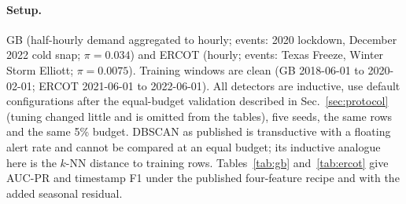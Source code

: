\documentclass[10pt,twocolumn]{article}
\begin{document}
\paragraph{Setup.} GB (half-hourly demand aggregated to hourly; events: 2020 lockdown, December 2022 cold snap; $\pi=0.034$) and ERCOT (hourly; events: Texas Freeze, Winter Storm Elliott; $\pi=0.0075$). Training windows are clean (GB 2018-06-01 to 2020-02-01; ERCOT 2021-06-01 to 2022-06-01). All detectors are inductive, use default configurations after the equal-budget validation described in Sec.~\ref{sec:protocol} (tuning changed little and is omitted from the tables), five seeds, the same rows and the same 5\% budget. DBSCAN as published is transductive with a floating alert rate and cannot be compared at an equal budget; its inductive analogue here is the $k$-NN distance to training rows. Tables~\ref{tab:gb} and~\ref{tab:ercot} give AUC-PR and timestamp F1 under the published four-feature recipe and with the added seasonal residual.

\begin{table}[t]
\centering\scriptsize\setlength{\tabcolsep}{4pt}

\caption{GB demand ($\pi=0.034$). AUC-PR, VUS-PR and timestamp F1 at a 5\% budget, mean over five seeds; brackets are paired bootstrap intervals (7-day blocks for AUC-PR and F1, event-unit resampling for VUS-PR). $^\ast$ the interval of the difference to the best detector in that column excludes zero (exploratory: the best is chosen post hoc). AUC-PR intervals are not available for the residual feature set because that run predates the interval code.}\label{tab:gb}
\end{table}

\begin{table}[t]
\centering\scriptsize\setlength{\tabcolsep}{4pt}

\caption{ERCOT demand ($\pi=0.0075$); same conventions as Table~\ref{tab:gb}. No detector is reliably worse than the best in F1: two events cannot rank detectors.}\label{tab:ercot}
\end{table}
\end{document}
